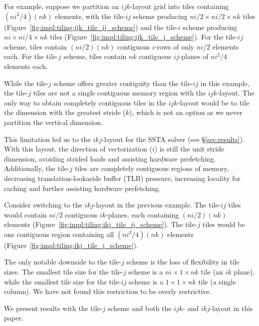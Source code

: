 \documentclass[10pt, conference, compsocconf]{IEEEtran}
\begin{document}
For example, suppose we partition an \(ijk\)-layout grid into tiles containing
  \((ni^2/4)(nk)\) elements, with the tile-\(ij\) scheme producing
  \(ni/2 \times ni/2 \times nk\) tiles
  (Figure~\ref{fig:impl:tiling:ijk_tile_ij_scheme})
  and the tile-\(i\) scheme producing
  \(ni \times ni/4 \times nk\) tiles
  (Figure~\ref{fig:impl:tiling:ijk_tile_j_scheme}).
For the tile-\(ij\) scheme, tiles contain \((ni/2)(nk)\) contiguous
  \(i\)-rows of only \(ni/2\) elements each.
For the tile-\(j\) scheme, tiles contain \(nk\) contiguous \(ij\)-planes of
  \(ni^2/4\) elements each.

While the tile-\(j\) scheme offers greater contiguity than the
  tile-\(ij\) in this example, the tile-\(j\) tiles are not a single contiguous
  memory region with the \(ijk\)-layout.
The only way to obtain completely contiguous tiles in the \(ijk\)-layout would
  be to tile the dimension with the greatest stride (\(k\)), which is not an
  option as we never partition the vertical dimension.

This limitation led us to the \(ikj\)-layout for the SSTA solver (see
  \S\ref{sec:results}).
With this layout, the direction of vectorization (\(i\)) is still the unit stride
  dimension, avoiding strided loads and assisting hardware prefetching.
Additionally, the tile-\(j\) tiles are completely contiguous regions of memory,
  decreasing translation-lookaside buffer (TLB) pressure, increasing locality for
  caching and further assisting hardware prefetching.

Consider switching to the \(ikj\)-layout in the previous example.
The tile-\(ij\) tiles would contain \(ni/2\) contiguous \(ik\)-planes, each
  containing \((ni/2)(nk)\) elements
  (Figure~\ref{fig:impl:tiling:ikj_tile_ij_scheme}).
The tile-\(j\) tiles would be one contiguous region containing all
  \((ni^2/4)(nk)\) elements
  (Figure~\ref{fig:impl:tiling:ikj_tile_j_scheme}).

The only notable downside to the tile-\(j\) scheme is the loss of
  flexibility in tile sizes.
The smallest tile size for the tile-\(j\) scheme is a \(ni \times 1 \times nk\)
  tile (an \(ik\) plane), while the smallest tile size for the
  tile-\(ij\) scheme is a \(1 \times 1 \times nk\) tile (a single column).
We have not found this restriction to be overly restrictive.

We present results with the tile-\(j\) scheme and both the \(ijk\)- and
  \(ikj\)-layout in this paper.

\end{document}
